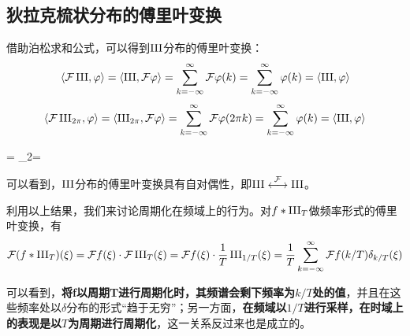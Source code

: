 
\subsection{狄拉克梳状分布的傅里叶变换}\label{sub:fourier_of_dirac_comb}
借助泊松求和公式，可以得到$\operatorname{III}$分布的傅里叶变换：
{\color{blue}\begin{align*}
    \left\langle \mathcal{F} \operatorname{III},\varphi \right\rangle=\left\langle \operatorname{III},\mathcal{F} \varphi\right\rangle=\sum_{k=-\infty}^{\infty}\mathcal{F} \varphi(k)=\sum_{k=-\infty}^{\infty}\varphi(k)=\left\langle \operatorname{III},\varphi\right\rangle
\end{align*}}
{\color{red}\begin{align*}
    \left\langle \mathcal{F} \operatorname{III}_{2\pi},\varphi \right\rangle=\left\langle \operatorname{III}_{2\pi},\mathcal{F} \varphi\right\rangle=\sum_{k=-\infty}^{\infty}\mathcal{F} \varphi(2\pi k)=\sum_{k=-\infty}^{\infty}\varphi(k)=\left\langle \operatorname{III},\varphi\right\rangle
\end{align*}}

\begin{proposition}
\begin{lralign}
     \shah=\shah
    \switch
     \shah_{2\pi}=\shah
\end{lralign}
\end{proposition}
可以看到，$\operatorname{III}$分布的傅里叶变换具有自对偶性，即{\color{blue}$\operatorname{III}\overset{\mathcal{F} }{\longleftrightarrow}\operatorname{III}$}。

利用以上结果，我们来讨论周期化在频域上的行为。对$f*\operatorname{III}_T$做频率形式的傅里叶变换，有
{\color{blue}\begin{align*}
    \mathcal{F} (f*\operatorname{III}_T)(\xi)=\mathcal{F} f(\xi)\cdot\mathcal{F} \operatorname{III}_T(\xi)=\mathcal{F} f(\xi)\cdot\frac{1}{T}\operatorname{III}_{1/T}(\xi)=\frac{1}{T}\sum_{k=-\infty}^{\infty}\mathcal{F} f(k/T)\delta_{k/T}(\xi)
\end{align*}}

可以看到，\textbf{将f以周期T进行周期化时，其频谱会剩下频率为$k/T$处的值}，并且在这些频率处以$\delta$分布的形式“趋于无穷”；另一方面，\textbf{在频域以$1/T$进行采样，在时域上的表现是以$T$为周期进行周期化}，这一关系反过来也是成立的。

